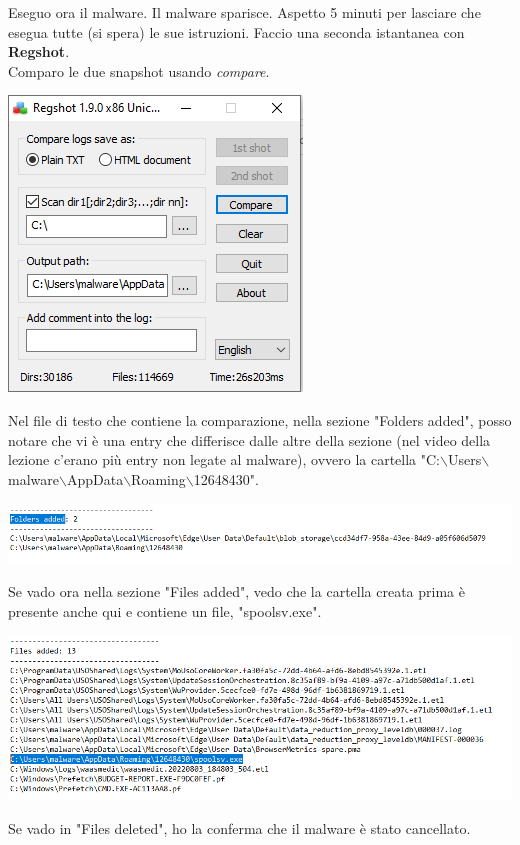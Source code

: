 \documentclass[a4paper]{book}
\begin{document}
Eseguo ora il malware. Il malware sparisce. Aspetto 5 minuti per lasciare che esegua tutte (si spera) le sue istruzioni. Faccio una seconda istantanea con \textbf{Regshot}.
\\

Comparo le due snapshot usando \textit{compare}. 

\begin{center}
    \includegraphics[]{images/20-10/2.png}
\end{center}
Nel file di testo che contiene la comparazione, nella sezione "Folders added", posso notare che vi è una entry che differisce dalle altre della sezione (nel video della lezione c'erano più entry non legate al malware), ovvero la cartella "C:$\backslash$Users$\backslash$malware$\backslash$AppData$\backslash$Roaming$\backslash$12648430".\\
\begin{center}
    \includegraphics[width=1\textwidth]{images/20-10/3.png}
\end{center}
Se vado ora nella sezione "Files added", vedo che la cartella creata prima è presente anche qui e contiene un file, "spoolsv.exe".
\begin{center}
    \includegraphics[width=1\textwidth]{images/20-10/4.png}
\end{center}
Se vado in "Files deleted", ho la conferma che il malware è stato cancellato.
\end{document}
